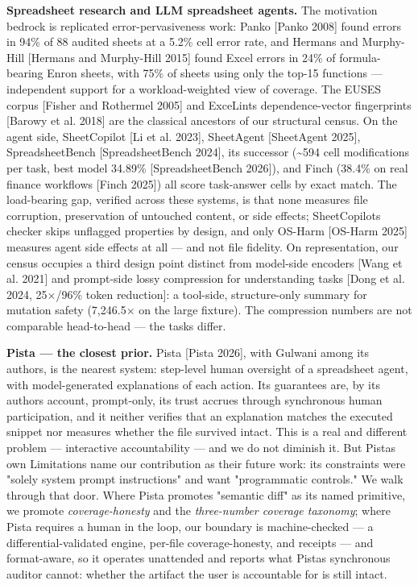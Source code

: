 \documentclass[
]{article}
\newcounter{none} %
\begin{document}
\textbf{Spreadsheet research and LLM spreadsheet agents.} The motivation
bedrock is replicated error-pervasiveness work: Panko {[}Panko 2008{]}
found errors in 94\% of 88 audited sheets at a 5.2\% cell error rate,
and Hermans and Murphy-Hill {[}Hermans and Murphy-Hill 2015{]} found
Excel errors in 24\% of formula-bearing Enron sheets, with 75\% of
sheets using only the top-15 functions --- independent support for a
workload-weighted view of coverage. The EUSES corpus {[}Fisher and
Rothermel 2005{]} and ExceLint\textquotesingle s dependence-vector
fingerprints {[}Barowy et al. 2018{]} are the classical ancestors of our
structural census. On the agent side, SheetCopilot {[}Li et al. 2023{]},
SheetAgent {[}SheetAgent 2025{]}, SpreadsheetBench {[}SpreadsheetBench
2024{]}, its successor (\textasciitilde594 cell modifications per task,
best model 34.89\% {[}SpreadsheetBench 2026{]}), and Finch (38.4\% on
real finance workflows {[}Finch 2025{]}) all score task-answer cells by
exact match. The load-bearing gap, verified across these systems, is
that none measures file corruption, preservation of untouched content,
or side effects; SheetCopilot\textquotesingle s checker skips unflagged
properties by design, and only OS-Harm {[}OS-Harm 2025{]} measures agent
side effects at all --- and not file fidelity. On representation, our
census occupies a third design point distinct from model-side encoders
{[}Wang et al. 2021{]} and prompt-side lossy compression for
understanding tasks {[}Dong et al. 2024, 25×/96\% token reduction{]}: a
tool-side, structure-only summary for mutation safety (7,246.5× on the
large fixture). The compression numbers are not comparable head-to-head
--- the tasks differ.

\textbf{Pista --- the closest prior.} Pista {[}Pista 2026{]}, with
Gulwani among its authors, is the nearest system: step-level human
oversight of a spreadsheet agent, with model-generated explanations of
each action. Its guarantees are, by its authors\textquotesingle{}
account, prompt-only, its trust accrues through synchronous human
participation, and it neither verifies that an explanation matches the
executed snippet nor measures whether the file survived intact. This is
a real and different problem --- interactive accountability --- and we
do not diminish it. But Pista\textquotesingle s own Limitations name our
contribution as their future work: its constraints were "solely system
prompt instructions" and want "programmatic controls." We walk through
that door. Where Pista promotes "semantic diff" as its named primitive,
we promote \emph{coverage-honesty} and the \emph{three-number coverage
taxonomy}; where Pista requires a human in the loop, our boundary is
machine-checked --- a differential-validated engine, per-file
coverage-honesty, and receipts --- and format-aware, so it operates
unattended and reports what Pista\textquotesingle s synchronous auditor
cannot: whether the artifact the user is accountable for is still
intact.
\end{document}
